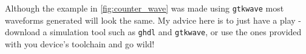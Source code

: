 Although the example in \cref{fig:counter_wave} was made using \texttt{gtkwave} most waveforms generated will look the same. My advice here is to just have a play - download a simulation tool such as \texttt{ghdl} and \texttt{gtkwave}, or use the ones provided with you device's toolchain and go wild!